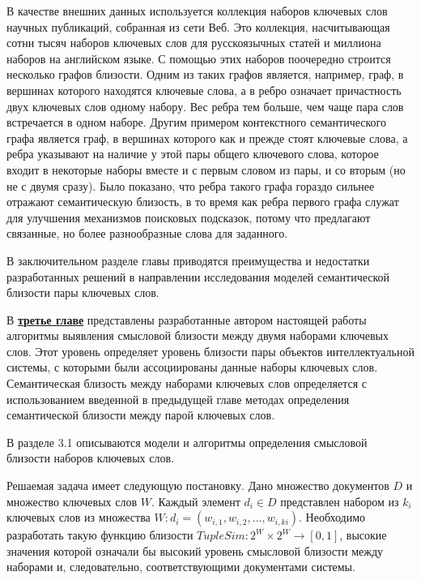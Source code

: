В качестве внешних данных используется коллекция наборов ключевых слов научных публикаций, собранная из сети Веб. Это коллекция, насчитывающая сотни тысяч наборов ключевых слов для русскоязычных статей и миллиона наборов на английском языке. С помощью этих наборов поочередно строится несколько графов близости. Одним из таких графов является, например, граф, в вершинах которого находятся ключевые слова, а в ребро означает причастность двух ключевых слов одному набору. Вес ребра тем больше, чем чаще пара слов встречается в одном наборе. Другим примером контекстного семантического графа является граф, в вершинах которого как и прежде стоят ключевые слова, а ребра указывают на наличие у этой пары общего ключевого слова, которое входит в некоторые наборы вместе и с первым словом из пары, и со вторым (но не с двумя сразу). Было показано, что ребра такого графа гораздо сильнее отражают семантическую близость, в то время как ребра первого графа служат для улучшения механизмов поисковых подсказок, потому что предлагают связанные, но более разнообразные слова для заданного.


В заключительном разделе главы приводятся преимущества и недостатки разработанных решений в направлении исследования моделей семантической близости пары ключевых слов.

В \underline{\textbf{третье главе}} представлены разработанные автором настоящей работы алгоритмы выявления смысловой близости между двумя наборами ключевых слов.  Этот уровень определяет уровень близости пары объектов интеллектуальной системы, с которыми были ассоциированы данные наборы ключевых слов.
Семантическая близость между наборами ключевых слов определяется с использованием введенной  в предыдущей главе методах определения семантической близости между парой ключевых слов.


В разделе 3.1 описываются модели и алгоритмы определения смысловой близости наборов ключевых слов. 

Решаемая задача имеет следующую постановку. Дано множество документов $D$ и множество ключевых слов $W$. Каждый элемент $d_i \in D$ представлен набором из $k_i$ ключевых слов из множества $W: d_i = (w_{i,1},w_{i,2},...,w_{i,ki})$. Необходимо разработать такую функцию близости $TupleSim : 2^W \times 2^W \rightarrow [0, 1]$, высокие значения которой означали бы высокий уровень смысловой близости между наборами и, следовательно, соответствующими документами системы. 

